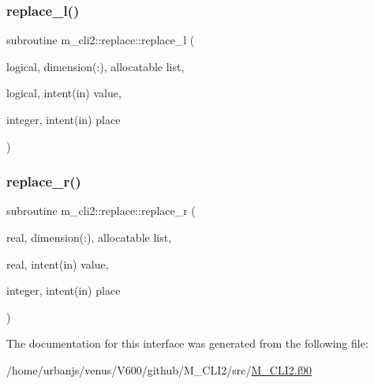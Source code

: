 \mbox{\label{interfacem__cli2_1_1replace_a9c995edced1d2665777e794a3aa5b2a0}} 
\subsubsection{\texorpdfstring{replace\+\_\+l()}{replace\_l()}}
{\footnotesize\ttfamily subroutine m\+\_\+cli2\+::replace\+::replace\+\_\+l (\begin{DoxyParamCaption}\item[{logical, dimension(\+:), allocatable}]{list,  }\item[{logical, intent(in)}]{value,  }\item[{integer, intent(in)}]{place }\end{DoxyParamCaption})\hspace{0.3cm}{\ttfamily [private]}}

\mbox{\label{interfacem__cli2_1_1replace_adf284ee215097b8416e81532b7d4251b}} 
\subsubsection{\texorpdfstring{replace\+\_\+r()}{replace\_r()}}
{\footnotesize\ttfamily subroutine m\+\_\+cli2\+::replace\+::replace\+\_\+r (\begin{DoxyParamCaption}\item[{real, dimension(\+:), allocatable}]{list,  }\item[{real, intent(in)}]{value,  }\item[{integer, intent(in)}]{place }\end{DoxyParamCaption})\hspace{0.3cm}{\ttfamily [private]}}



The documentation for this interface was generated from the following file\+:\begin{DoxyCompactItemize}
\item 
/home/urbanjs/venus/\+V600/github/\+M\+\_\+\+C\+L\+I2/src/\mbox{\hyperlink{M__CLI2_8f90}{M\+\_\+\+C\+L\+I2.\+f90}}\end{DoxyCompactItemize}
